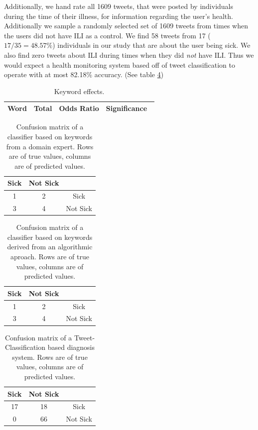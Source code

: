 \documentclass{acm_proc_article-sp}
\begin{document}
Additionally, we hand rate all 1609 tweets, that were posted by individuals during the time of their illness,  for information regarding the user's health. Additionally we sample a randomly selected set of 1609 tweets from times when the users did not have ILI as a control. We find 58 tweets from 17 (\(17/35 = 48.57\%\))  individuals in our study that are about the user being sick. We also find zero tweets about ILI during times when they did \textit{not} have ILI. Thus we would expect a health monitoring system based off of tweet classification to operate with at most 82.18\% accuracy. (See table \ref{tab:tweet_classified_confusion})

%

\begin{table}
\centering
\begin{tabular}{|c|c|c|c|} \hline
Word& Total &Odds Ratio & Significance\ \\ \hline

\end{tabular}
\caption{Keyword effects.}
\label{tab:tweet_keyword_expert_results}
\end{table}

\begin{table}
\centering
\begin{tabular}{|c|c|c|} \hline
Sick&Not Sick&\ \\ \hline
1 & 2& Sick\\ \hline
3 & 4  & Not Sick\\
\hline\end{tabular}
\caption{Confusion matrix of a classifier based on keywords from a domain expert. Rows are of true values, columns are of predicted values.}
\label{tab:tweet_keyword_expert_confusion}
\end{table}

\begin{table}
\centering
\begin{tabular}{|c|c|c|} \hline
Sick&Not Sick&\ \\ \hline
1 & 2& Sick\\ \hline
3 & 4  & Not Sick\\
\hline\end{tabular}
\caption{Confusion matrix of a classifier based on keywords derived from an algorithmic aproach. Rows are of true values, columns are of predicted values.}
\label{tab:tweet_keyword_algorithm_classified_confusion}
\end{table}

\begin{table}
\centering
\begin{tabular}{|c|c|c|} \hline
Sick&Not Sick&\ \\ \hline
17 & 18 & Sick\\ \hline
0 & 66  & Not Sick\\
\hline\end{tabular}
\caption{Confusion matrix of a Tweet-Classification based diagnosis system. Rows are of true values, columns are of predicted values.}
\label{tab:tweet_classified_confusion}
\end{table}
\end{document}
